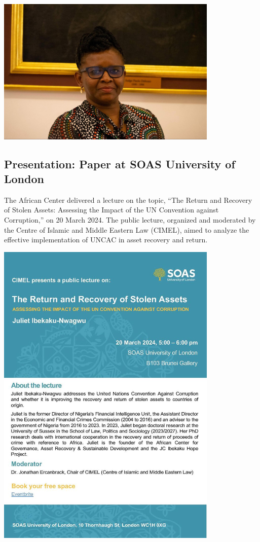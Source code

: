 \documentclass[
  letterpaper,
  DIV=11,
  numbers=noendperiod]{scrreprt}
\begin{document}
\begin{center}
\includegraphics[width=4.16667in,height=\textheight,keepaspectratio]{images/return/04_int.jpg}
\end{center}

\subsection{Presentation: Paper at SOAS University of
London}\label{presentation-paper-at-soas-university-of-london}

The African Center delivered a lecture on the topic, ``The Return and
Recovery of Stolen Assets: Assessing the Impact of the UN Convention
against Corruption,'' on 20 March 2024. The public lecture, organized
and moderated by the Centre of Islamic and Middle Eastern Law (CIMEL),
aimed to analyze the effective implementation of UNCAC in asset recovery
and return.

\begin{center}
\includegraphics[width=4.16667in,height=\textheight,keepaspectratio]{images/return/05_pres.png}
\end{center}
\end{document}
